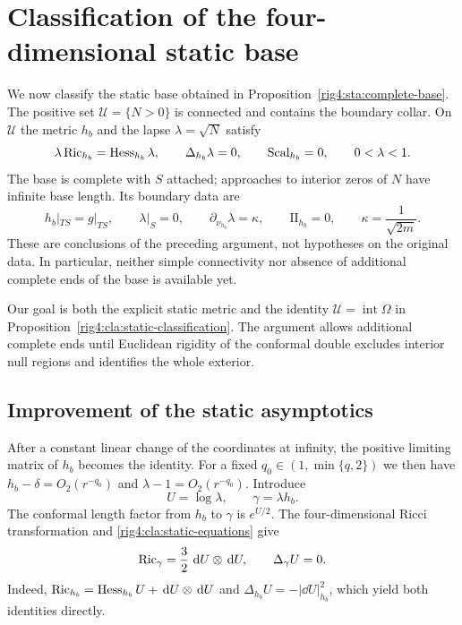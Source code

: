 \section{Classification of the four-dimensional static base}
\label{rig4:cla:section}

We now classify the static base obtained in
Proposition~\ref{rig4:sta:complete-base}.  The positive set $\mathcal U=\{N>0\}$
is connected and contains the boundary collar.  On $\mathcal U$ the metric
$h_b$ and the lapse $\lambda=\sqrt N$ satisfy
\begin{equation}\label{rig4:cla:static-equations}
 \lambda\operatorname{Ric}_{h_b}=\operatorname{Hess}_{h_b}\lambda,
 \qquad \Delta_{h_b}\lambda=0,
 \qquad \operatorname{Scal}_{h_b}=0,
 \qquad 0<\lambda<1.
\end{equation}
The base is complete with $S$ attached; approaches to interior zeros of $N$
have infinite base length.  Its boundary data are
\begin{equation}\label{rig4:cla:boundary-data}
 h_b|_{TS}=g|_{TS},\qquad
 \lambda|_S=0,\qquad
 \partial_{\nu_{h_b}}\lambda=\kappa,\qquad
 \mathrm{II}_{h_b}=0,
 \qquad \kappa=\frac1{\sqrt{2m}}.
\end{equation}
These are conclusions of the preceding argument, not hypotheses on the
original data.  In particular, neither simple connectivity nor absence
of additional complete ends of the base is available yet.

Our goal is both the explicit static metric and the identity
$\mathcal U=\operatorname{int}\Omega$ in
Proposition~\ref{rig4:cla:static-classification}.  The argument allows additional
complete ends until Euclidean rigidity of the conformal double excludes
interior null regions and identifies the whole exterior.

\subsection{Improvement of the static asymptotics}

After a constant linear change of the coordinates at infinity, the
positive limiting matrix of $h_b$ becomes the identity.  For a fixed
$q_0\in(1,\min\{q,2\})$ we then have
$h_b-\delta=O_2(r^{-q_0})$ and
$\lambda-1=O_2(r^{-q_0})$.  Introduce
\begin{equation}\label{rig4:cla:reduced-variables}
 U=\log\lambda,\qquad \gamma=\lambda h_b.
\end{equation}
The conformal length factor from $h_b$ to $\gamma$ is $e^{U/2}$.
The four-dimensional Ricci transformation and
\eqref{rig4:cla:static-equations} give
\begin{equation}\label{rig4:cla:reduced-equations}
 \operatorname{Ric}_\gamma=\frac32\,\,\mathrm d U\otimes\,\mathrm d U,
 \qquad \Delta_\gamma U=0.
\end{equation}
Indeed,
$\operatorname{Ric}_{h_b}=\operatorname{Hess}_{h_b}U+\,\mathrm d U\otimes\,\mathrm d U$ and
$\Delta_{h_b}U=-|\dd U|_{h_b}^2$, which yield both identities directly.

